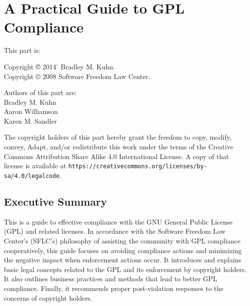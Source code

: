 
\part{A Practical Guide to GPL Compliance}
\label{gpl-compliance-guide}

{\parindent 0in
This part is: \\
\begin{tabbing}
Copyright \= \copyright{} 2014 \= \hspace{.2in} Bradley M. Kuhn. \\
Copyright \> \copyright{} 2008 \> \hspace{.2in} Software Freedom Law Center. \\
\end{tabbing}

\vspace{1in}

\begin{center}
Authors of this part are: \\

Bradley M. Kuhn \\
Aaron Williamson \\
Karen M. Sandler \\

\vspace{3in}


The copyright holders of this part hereby grant the freedom to copy, modify,
convey, Adapt, and/or redistribute this work under the terms of the Creative
Commons Attribution Share Alike 4.0 International License.  A copy of that
license is available at
\verb=https://creativecommons.org/licenses/by-sa/4.0/legalcode=. 
\end{center}
}

\bigskip

\chapter*{Executive Summary}

This is a guide to effective compliance with the GNU General Public
License (GPL) and related licenses. In accordance with the Software
Freedom Law Center's (SFLC's) philosophy of assisting the community with
GPL compliance cooperatively, this guide focuses on avoiding compliance
actions and minimizing the negative impact when enforcement actions occur.
It introduces and explains basic legal concepts related to the GPL and its
enforcement by copyright holders. It also outlines business practices and
methods that lead to better GPL compliance.  Finally, it recommends proper
post-violation responses to the concerns of copyright holders.

